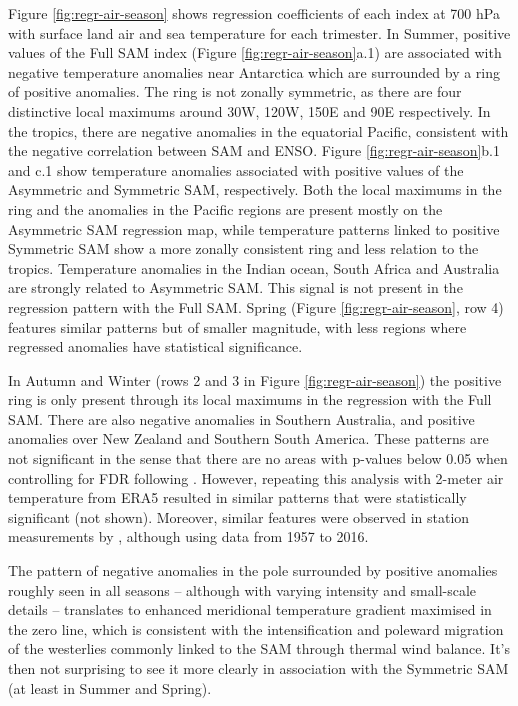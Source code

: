 \documentclass[smallextended]{svjour3}       %
\begin{document}
Figure \ref{fig:regr-air-season} shows regression coefficients of each index at 700 hPa with surface land air and sea temperature for each trimester. In Summer, positive values of the Full SAM index (Figure \ref{fig:regr-air-season}a.1) are associated with negative temperature anomalies near Antarctica which are surrounded by a ring of positive anomalies. The ring is not zonally symmetric, as there are four distinctive local maximums around 30\degree W, 120\degree W, 150\degree E and 90\degree E respectively. In the tropics, there are negative anomalies in the equatorial Pacific, consistent with the negative correlation between SAM and ENSO. Figure \ref{fig:regr-air-season}b.1 and c.1 show temperature anomalies associated with positive values of the Asymmetric and Symmetric SAM, respectively. Both the local maximums in the ring and the anomalies in the Pacific regions are present mostly on the Asymmetric SAM regression map, while temperature patterns linked to positive Symmetric SAM show a more zonally consistent ring and less relation to the tropics. Temperature anomalies in the Indian ocean, South Africa and Australia are strongly related to Asymmetric SAM. This signal is not present in the regression pattern with the Full SAM. Spring (Figure \ref{fig:regr-air-season}, row 4) features similar patterns but of smaller magnitude, with less regions where regressed anomalies have statistical significance.

In Autumn and Winter (rows 2 and 3 in Figure \ref{fig:regr-air-season}) the positive ring is only present through its local maximums in the regression with the Full SAM. There are also negative anomalies in Southern Australia, and positive anomalies over New Zealand and Southern South America. These patterns are not significant in the sense that there are no areas with p-values below 0.05 when controlling for FDR following \citet{wilks2016}. However, repeating this analysis with 2-meter air temperature from ERA5 resulted in similar patterns that were statistically significant (not shown). Moreover, similar features were observed in station measurements by \citet{jones2019}, although using data from 1957 to 2016.

The pattern of negative anomalies in the pole surrounded by positive anomalies roughly seen in all seasons -- although with varying intensity and small-scale details -- translates to enhanced meridional temperature gradient maximised in the zero line, which is consistent with the intensification and poleward migration of the westerlies commonly linked to the SAM through thermal wind balance. It's then not surprising to see it more clearly in association with the Symmetric SAM (at least in Summer and Spring).
\end{document}
